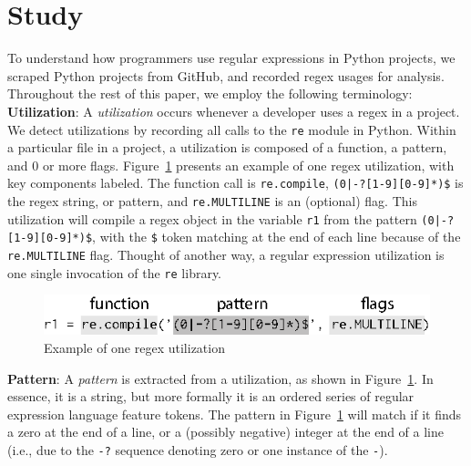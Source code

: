 \section{Study}
\label{sec:study}

To understand how programmers use regular expressions in Python projects, we scraped  Python projects from GitHub, and recorded regex usages for analysis. Throughout the rest of this paper, we  employ the following terminology:\\

\noindent \textbf{Utilization}: A \emph{utilization} occurs whenever a developer uses a regex  in a project.  We detect utilizations by recording all calls to the {\tt re} module in Python.
Within a particular file in a project, a {utilization} is composed of a function, a pattern, and 0 or more flags.  Figure~\ref{fig:exampleUsage} presents an example of one regex {utilization}, with key components labeled. The function call is {\tt re.compile}, \verb!(0|-?[1-9][0-9]*)$! is the regex string, or pattern, and {\tt re.MULTILINE} is an (optional) flag. This {utilization}  will compile a regex object in the variable {\tt r1} from the pattern \verb!(0|-?[1-9][0-9]*)$!, with the \verb!$! token matching at the end of each line because of the {\tt re.MULTILINE} flag. Thought of another way, a regular expression  utilization is one single invocation of the {\tt re} library.\\

\begin{figure}[tb]
\centering
\includegraphics[width=\columnwidth]{../illustrations/exampleUsage.eps}
\vspace{-6pt}
\caption{Example of one regex utilization}
\vspace{-6pt}
\label{fig:exampleUsage}
\end{figure}

\noindent \textbf{Pattern}: A \emph{pattern} is extracted from a utilization, as shown in Figure~\ref{fig:exampleUsage}. In essence, it is a string, but more formally it is an ordered series of regular expression language feature tokens.  The pattern in Figure~\ref{fig:exampleUsage}  will match if it finds a zero at the end of a line, or a (possibly negative) integer at the end of a line (i.e., due to the {\tt -?} sequence denoting zero or one instance of the {\tt -}).

